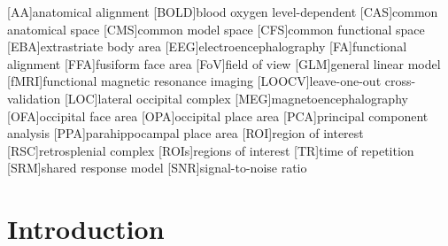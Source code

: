 \documentclass[english,12pt]{report}
\begin{document}
\begin{spacing}{1.5}
\renewcommand{\baselinestretch}{0.75}\normalsize

\begin{acronym}[longest]
    [AA]{anatomical alignment}
    [BOLD]{blood oxygen level-dependent}
    [CAS]{common anatomical space}
    [CMS]{common model space}
    [CFS]{common functional space}
    [EBA]{extrastriate body area}
    [EEG]{electroencephalography}
    [FA]{functional alignment}
    [FFA]{fusiform face area}
    [FoV]{field of view}
    [GLM]{general linear model}
    [fMRI]{functional magnetic resonance imaging}
    [LOOCV]{leave-one-out cross-validation}
    [LOC]{lateral occipital complex}
    [MEG]{magnetoencephalography}
    [OFA]{occipital face area}
    [OPA]{occipital place area}
    [PCA]{principal component analysis}
    [PPA]{parahippocampal place area}
    [ROI]{region of interest}
    [RSC]{retrosplenial complex}
    [ROIs]{regions of interest}
    [TR]{time of repetition}
    [SRM]{shared response model}
    [SNR]{signal-to-noise ratio}
\end{acronym}

\renewcommand{\baselinestretch}{1}\normalsize




\tableofcontents












\chapter{Introduction}
\setcounter{page}{1}


\end{spacing}
\end{document}

